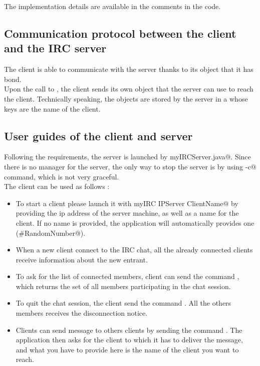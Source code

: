 \documentclass{article}
\begin{document}
The implementation details are available in the comments in the code.

\subsection{Communication protocol between the client and the IRC server}

The client is able to communicate with the server thanks to its object that it has bond.\\
Upon the call to \verb@connect@, the client sends its own \verb@myIRCCallbackImpl@ object that the server can use to reach the client. Technically speaking, the \verb@myIRCCallbackImpl@ objects are stored by the server in a \verb@hashmap@ whose keys are the name of the client.

\subsection{User guides of the client and server}
Following the requirements, the server is launched by \verb@java myIRCServer.java@. Since there is no manager for the server, the only way to stop the server is by using \verb@ctrl-c@ command, which is not very graceful.\\

The client can be used as follows : 
\begin{itemize}
\item To start a client please launch it with \verb@java myIRC IPServer ClientName@ by providing the ip address of the server machine, as well as a name for the client. If no name is provided, the application will automatically provides one (\verb@guest#RandomNumber@).
\item When a new client connect to the IRC chat, all the already connected clients receive information about the new entrant.
\item To ask for the list of connected members, client can send the command \verb@who@, which returns the set of all members participating in the chat session.
\item To quit the chat session, the client send the command \verb@quit@. All the others members receives the disconnection notice.
\item Clients can send message to others clients by sending the command \verb@msg@. The application then asks for the client to which it has to deliver the message, and what you have to provide here is the name of the client you want to reach.
\end{itemize}
\end{document}

